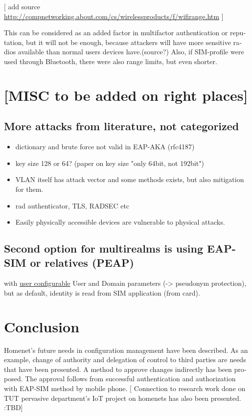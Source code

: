 \documentclass[12pt,a4paper,english]{tutthesis}
\begin{document}
\begin{otherlanguage}{english}
[ add source
\url{http://compnetworking.about.com/cs/wirelessproducts/f/wifirange.htm} ]

This can be considered as an added factor in multifactor
authentication or reputation, but it will not be enough, because
attackers will have more sensitive  radios available than normal users devices have.(source?)
Also, if SIM-profile were used through Bluetooth, there were also
range limits, but even shorter.

\chapter{[MISC to be added on right places]}
\label{sec-7}


\section{More attacks from literature, not categorized}
\label{sec-7-1}
\begin{itemize}
\item dictionary and brute force not valid in EAP-AKA (rfc4187)
\item key size 128 or 64? (paper on key size "only 64bit, not 192bit")
\item VLAN itself has attack vector and some methods exists, but also
mitigation for them.
\item rad authenticator, TLS, RADSEC etc
\item Easily physically accessible devices are vulnerable to physical attacks.
\end{itemize}
\section{Second option for multirealms is using EAP-SIM or relatives (PEAP)}
\label{sec-7-2}
with \uline{user configurable} User and Domain parameters (-> pseudonym
protection), but as default, identity is read from SIM application (from
card).


\chapter{Conclusion}
\label{sec-8}




Homenet's future needs in configuration management have been
described. As an example, change of authority and delegation of
control to third parties are needs that have been presented.  A method to approve
changes indirectly has been proposed. The approval follows from
successful authentication and authorization with EAP-SIM method by
mobile phone. 
[ Connection to research work done on TUT pervasive
department's IoT project on homenets has also been presented. :TBD]




\end{otherlanguage}
\end{document}
